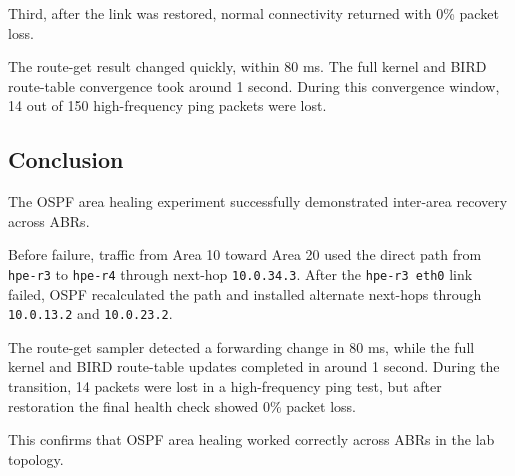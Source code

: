 Third, after the link was restored, normal connectivity returned with 0\% packet loss.

The route-get result changed quickly, within 80 ms. The full kernel and BIRD route-table convergence took around 1 second. During this convergence window, 14 out of 150 high-frequency ping packets were lost.

\subsection{Conclusion}

The OSPF area healing experiment successfully demonstrated inter-area recovery across ABRs.

Before failure, traffic from Area 10 toward Area 20 used the direct path from \texttt{hpe-r3} to \texttt{hpe-r4} through next-hop \texttt{10.0.34.3}. After the \texttt{hpe-r3 eth0} link failed, OSPF recalculated the path and installed alternate next-hops through \texttt{10.0.13.2} and \texttt{10.0.23.2}.

The route-get sampler detected a forwarding change in 80 ms, while the full kernel and BIRD route-table updates completed in around 1 second. During the transition, 14 packets were lost in a high-frequency ping test, but after restoration the final health check showed 0\% packet loss.

This confirms that OSPF area healing worked correctly across ABRs in the lab topology.

